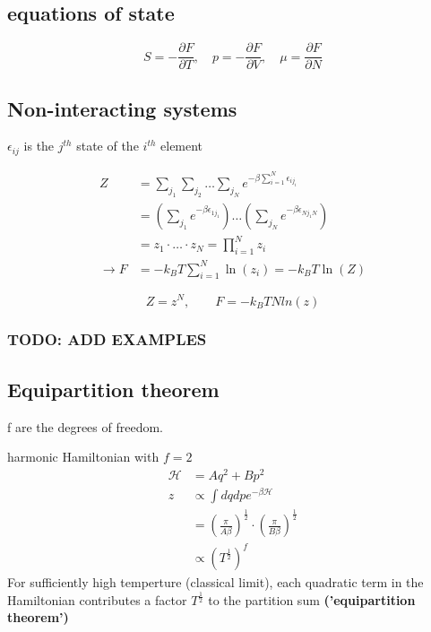 \subsection*{equations of state}
\begin{equation*}
    S = - \frac{\partial F}{\partial T}, \quad p = - \frac{\partial F}{\partial V}, \quad \mu = \frac{\partial F}{\partial N}
\end{equation*}

\subsection*{Non-interacting systems}
$\epsilon_{ij}$ is the $j^{th}$ state of the $i^{th}$ element

\begin{equation*}
    \begin{aligned}
        Z &= \sum_{j_1} \sum_{j_2} \dots \sum_{j_N} e^{-\beta \sum_{i=1}^N \epsilon_{ij_i}} \\
        &= \left(\sum_{j_1} e^{-\beta \epsilon_{1j_1}}\right) \dots \left(\sum_{j_N} e^{-\beta \epsilon_{Nj_1N}}\right) \\
        &= z_1 \cdot \dots \cdot z_N = \prod_{i=1}^N z_i \\
        \rightarrow F &= -k_B T \sum_{i=1}^N \ln(z_i) = -k_B T \ln(Z)
    \end{aligned}
\end{equation*}

\begin{equation*}
    Z = z^N , \qquad F = -k_B T N ln(z)
\end{equation*}

\subsubsection*{TODO: ADD EXAMPLES}

\subsection*{Equipartition theorem}
f are the degrees of freedom.

harmonic Hamiltonian with $f=2$
\begin{equation*}
    \begin{aligned}
        \mathcal{H} &= Aq^2 + Bp^2 \\
        z &\propto \int dq dp e^{-\beta \mathcal{H}} \\
        &= \left(\frac{\pi}{A\beta}\right)^{\frac{1}{2}} \cdot \left(\frac{\pi}{B \beta}\right)^{\frac{1}{2}} \\
        &\propto \left(T^{\frac{1}{2}}\right)^f
    \end{aligned}
\end{equation*}
For sufficiently high temperture (classical limit), each quadratic term 
in the Hamiltonian contributes a factor $T^{\frac{1}{2}}$ to the partition sum \textbf{('equipartition theorem')}

